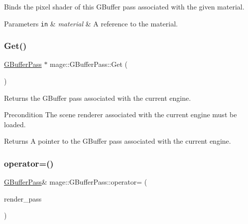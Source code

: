 Binds the pixel shader of this G\+Buffer pass associated with the given material.


\begin{DoxyParams}[1]{Parameters}
\mbox{\tt in}  & {\em material} & A reference to the material. \\
\hline
\end{DoxyParams}
\hypertarget{classmage_1_1_g_buffer_pass_ab2a50a7bde900978153badaa49cf047c}{}\label{classmage_1_1_g_buffer_pass_ab2a50a7bde900978153badaa49cf047c} 
\subsubsection{\texorpdfstring{Get()}{Get()}}
{\footnotesize\ttfamily \hyperlink{classmage_1_1_g_buffer_pass}{G\+Buffer\+Pass} $\ast$ mage\+::\+G\+Buffer\+Pass\+::\+Get (\begin{DoxyParamCaption}{ }\end{DoxyParamCaption})\hspace{0.3cm}{\ttfamily [static]}}

Returns the G\+Buffer pass associated with the current engine.

\begin{DoxyPrecond}{Precondition}
The scene renderer associated with the current engine must be loaded. 
\end{DoxyPrecond}
\begin{DoxyReturn}{Returns}
A pointer to the G\+Buffer pass associated with the current engine. 
\end{DoxyReturn}
\hypertarget{classmage_1_1_g_buffer_pass_a79468fb8b4547197315c0aabbabffa71}{}\label{classmage_1_1_g_buffer_pass_a79468fb8b4547197315c0aabbabffa71} 
\subsubsection{\texorpdfstring{operator=()}{operator=()}\hspace{0.1cm}{\footnotesize\ttfamily [1/2]}}
{\footnotesize\ttfamily \hyperlink{classmage_1_1_g_buffer_pass}{G\+Buffer\+Pass}\& mage\+::\+G\+Buffer\+Pass\+::operator= (\begin{DoxyParamCaption}\item[{const \hyperlink{classmage_1_1_g_buffer_pass}{G\+Buffer\+Pass} \&}]{render\+\_\+pass }\end{DoxyParamCaption})\hspace{0.3cm}{\ttfamily [delete]}}

